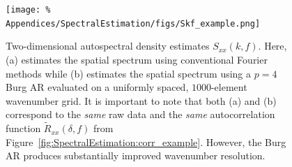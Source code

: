 \begin{figure}
  \centering
  \texttt{[image: \%
    Appendices/SpectralEstimation/figs/Skf\_example.png]}
  \caption[$2$d autospectral density estimates]{%
    Two-dimensional autospectral density estimates $S_{xx}(k, f)$.
    Here, (a) estimates the spatial spectrum
    using conventional Fourier methods while
    (b) estimates the spatial spectrum
    using a $p = 4$ Burg AR evaluated
    on a uniformly spaced, $1000$-element wavenumber grid.
    It is important to note that both (a) and (b)
    correspond to the \emph{same} raw data and
    the \emph{same} autocorrelation function $\tilde{R}_{xx}(\delta, f)$
    from Figure~\ref{fig:SpectralEstimation:corr_example}.
    However, the Burg AR produces substantially improved
    wavenumber resolution.
  }
  \label{fig:SpectralEstimation:Skf_example}
\end{figure}




